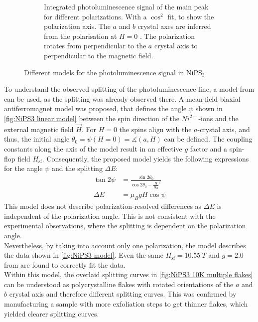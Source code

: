\documentclass[
	twoside,
	parskip=half,
	a4paper,
]{scrbook}
\begin{document}
\begin{figure}
\begin{subfigure}[t]{3in}
		\caption{
			Integrated photoluminescence signal of the main peak for different polarizations. 
			With a $\cos^2$ fit, to show the polarization axis. 
			The $a$ and $b$ crystal axes are inferred from the polarisation at $H=0$ \cite{NiPS3_linear}.
			The polarization rotates from perpendicular to the $a$ crystal axis to perpendicular to the magnetic field. 
		}
		\label{fig:NiPS3 polarisation peanut}
	\end{subfigure}
	\caption{Different models for the photoluminescence signal in NiPS$_3$.}
\end{figure}
To understand the observed splitting of the photoluminescence line, a model from \cite{NiPS3_magnon_gap} can be used, as the splitting was already observed there. 
A mean-field biaxial antiferromagnet model was proposed, that defines the angle $\psi$ shown in \autoref{fig:NiPS3 linear model} between the spin direction of the $Ni^{2+}$-ions and the external magnetic field $\vec{H}$.
For $H=0$ the spins align with the $a$-crystal axis, and thus, the initial angle $\theta_0=\psi\left(H=0\right)=\measuredangle(a, H)$ can be defined.
The coupling constants along the axis of the model result in an effective $g$ factor and a spin-flop field $H_\text{sf}$.
Consequently, the proposed model \autocite{NiPS3_magnon_gap} yields the following expressions for the angle $\psi$ and the splitting $\Delta E$:
\begin{align}
	\tan 2\psi &= \frac{\sin 2\theta_0}{\cos 2\theta_0 - \frac{H}{H_\text{sf}}^2}\\
	\Delta E &= \mu_B g H \cos \psi
	\label{eq:NiPS3 model}
\end{align}
This model does not describe polarization-resolved differences as $\Delta E$ is independent of the polarization angle.
This is not consistent with the experimental observations, where the splitting is dependent on the polarization angle.\\
Nevertheless, by taking into account only one polarization, the model describes the data shown in \autoref{fig:NiPS3 model}.
Even the same $H_\text{sf} = \SI{10.55}{T}$ and $g=\SI{2.0}{}$ from \autocite{NiPS3_magnon_gap} are found to correctly fit the data.\\
Within this model, the overlaid splitting curves in \autoref{fig:NiPS3 10K multiple flakes} can be understood as polycrystalline flakes with rotated orientations of the $a$ and $b$ crystal axis and therefore different splitting curves.
This was confirmed by manufacturing a sample with more exfoliation steps to get thinner flakes, which yielded clearer splitting curves.
\end{document}
